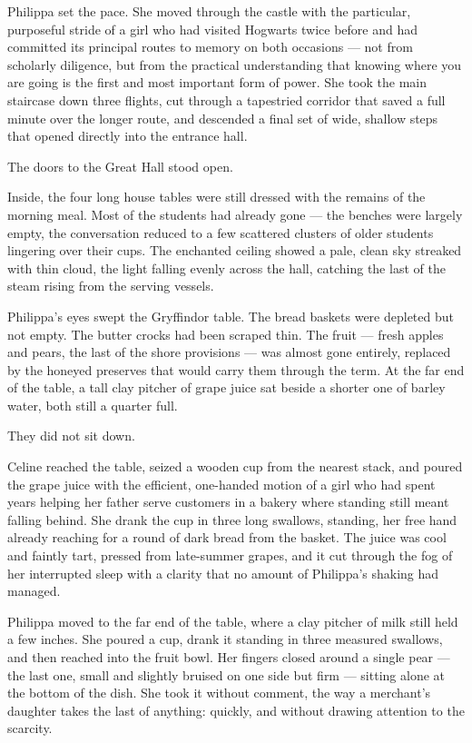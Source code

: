 Philippa set the pace. She moved through the castle with the particular, purposeful stride of a girl who had visited Hogwarts twice before and had committed its principal routes to memory on both occasions --- not from scholarly diligence, but from the practical understanding that knowing where you are going is the first and most important form of power. She took the main staircase down three flights, cut through a tapestried corridor that saved a full minute over the longer route, and descended a final set of wide, shallow steps that opened directly into the entrance hall.

The doors to the Great Hall stood open.

Inside, the four long house tables were still dressed with the remains of the morning meal. Most of the students had already gone --- the benches were largely empty, the conversation reduced to a few scattered clusters of older students lingering over their cups. The enchanted ceiling showed a pale, clean sky streaked with thin cloud, the light falling evenly across the hall, catching the last of the steam rising from the serving vessels.

Philippa's eyes swept the Gryffindor table. The bread baskets were depleted but not empty. The butter crocks had been scraped thin. The fruit --- fresh apples and pears, the last of the shore provisions --- was almost gone entirely, replaced by the honeyed preserves that would carry them through the term. At the far end of the table, a tall clay pitcher of grape juice sat beside a shorter one of barley water, both still a quarter full.

They did not sit down.

Celine reached the table, seized a wooden cup from the nearest stack, and poured the grape juice with the efficient, one-handed motion of a girl who had spent years helping her father serve customers in a bakery where standing still meant falling behind. She drank the cup in three long swallows, standing, her free hand already reaching for a round of dark bread from the basket. The juice was cool and faintly tart, pressed from late-summer grapes, and it cut through the fog of her interrupted sleep with a clarity that no amount of Philippa's shaking had managed.

Philippa moved to the far end of the table, where a clay pitcher of milk still held a few inches. She poured a cup, drank it standing in three measured swallows, and then reached into the fruit bowl. Her fingers closed around a single pear --- the last one, small and slightly bruised on one side but firm --- sitting alone at the bottom of the dish. She took it without comment, the way a merchant's daughter takes the last of anything: quickly, and without drawing attention to the scarcity.

